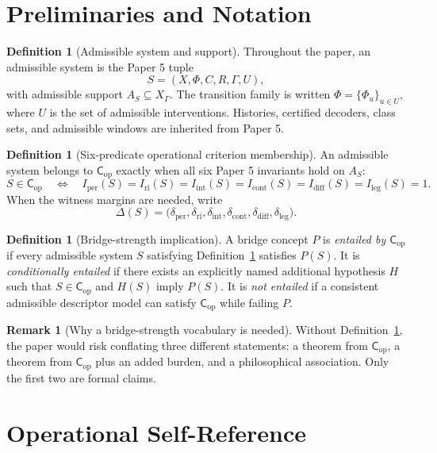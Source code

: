 \documentclass[11pt,a4paper]{article}
\theoremstyle{definition}
\newtheorem{definition}[theorem]{Definition}
\newtheorem{remark}[theorem]{Remark}
\newcommand{\Cop}{\mathsf{C}_{\mathrm{op}}}
\newcommand{\Aset}{A_S}
\newcommand{\Iper}{I_{\mathrm{per}}}
\newcommand{\Iri}{I_{\mathrm{ri}}}
\newcommand{\Iint}{I_{\mathrm{int}}}
\newcommand{\Icont}{I_{\mathrm{cont}}}
\newcommand{\Idiff}{I_{\mathrm{diff}}}
\newcommand{\Ileg}{I_{\mathrm{leg}}}
\begin{document}
\section{Preliminaries and Notation}

\begin{definition}[Admissible system and support]\label{def:bridge-system}
Throughout the paper, an admissible system is the Paper 5 tuple
\[
S=(X,\Phi,C,R,\Gamma,U),
\]
with admissible support $\Aset \subseteq X_\Gamma$. The transition family is written $\Phi=\{\Phi_u\}_{u\in U}$, where $U$ is the set of admissible interventions. Histories, certified decoders, class sets, and admissible windows are inherited from Paper 5.
\end{definition}

\begin{definition}[Six-predicate operational criterion membership]\label{def:bridge-cop}
An admissible system belongs to $\Cop$ exactly when all six Paper 5 invariants hold on $\Aset$:
\[
S \in \Cop
\quad\Longleftrightarrow\quad
\Iper(S)=\Iri(S)=\Iint(S)=\Icont(S)=\Idiff(S)=\Ileg(S)=1.
\]
When the witness margins are needed, write
\[
\Delta(S)=
\bigl(
\delta_{\mathrm{per}},
\delta_{\mathrm{ri}},
\delta_{\mathrm{int}},
\delta_{\mathrm{cont}},
\delta_{\mathrm{diff}},
\delta_{\mathrm{leg}}
\bigr).
\]
\end{definition}

\begin{definition}[Bridge-strength implication]\label{def:bridge-implication}
A bridge concept $P$ is \emph{entailed by $\Cop$} if every admissible system $S$ satisfying Definition~\ref{def:bridge-cop} satisfies $P(S)$. It is \emph{conditionally entailed} if there exists an explicitly named additional hypothesis $H$ such that $S\in\Cop$ and $H(S)$ imply $P(S)$. It is \emph{not entailed} if a consistent admissible descriptor model can satisfy $\Cop$ while failing $P$.
\end{definition}

\begin{remark}[Why a bridge-strength vocabulary is needed]
Without Definition~\ref{def:bridge-implication}, the paper would risk conflating three different statements: a theorem from $\Cop$, a theorem from $\Cop$ plus an added burden, and a philosophical association. Only the first two are formal claims.
\end{remark}

\section{Operational Self-Reference}
\end{document}
